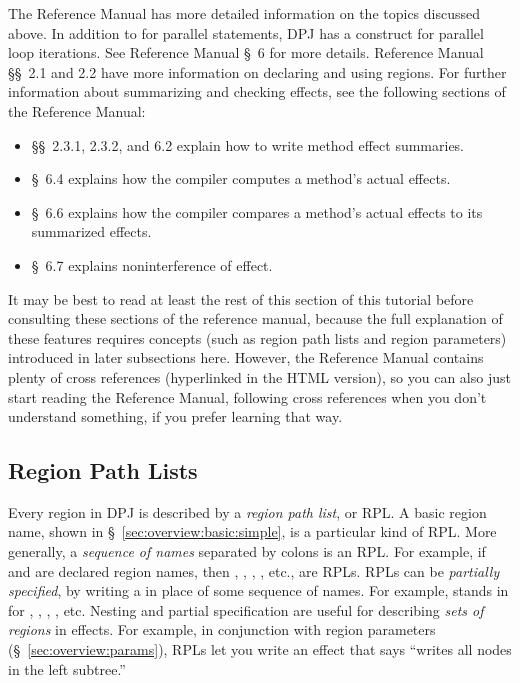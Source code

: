 The Reference Manual has more detailed information on the topics
discussed above.  In addition to  for parallel
statements, DPJ has a  construct for parallel loop
iterations.  See Reference Manual \S~6 for more details.  Reference
Manual \S\S~2.1 and 2.2 have more information on declaring and using
regions.  For further information about summarizing and checking
effects, see the following sections of the Reference Manual:
%
\begin{itemize}
%
\item 
\S\S~2.3.1, 2.3.2, and 6.2 explain how to write method effect summaries.
%
\item
\S~6.4 explains how the compiler computes a method's actual effects.
%
\item
\S~6.6 explains how the compiler compares a method's actual effects to
its summarized effects.
%
\item
\S~6.7 explains noninterference of effect.
\end{itemize}
%
It may be best to read at least the rest of this section of this
tutorial before consulting these sections of the reference manual,
because the full explanation of these features requires concepts (such
as region path lists and region parameters) introduced in later
subsections here.  However, the Reference Manual contains plenty of
cross references (hyperlinked in the HTML version), so you can also
just start reading the Reference Manual, following cross references
when you don't understand something, if you prefer learning that way.

\subsection{Region Path Lists%
\label{sec:overview:rpls}}

Every region in DPJ is described by a \emph{region path list}, or RPL.
A basic region name, shown in \S~\ref{sec:overview:basic:simple}, is a
particular kind of RPL.  More generally, a \emph{sequence of names}
separated by colons is an RPL.  For example, if  and 
are declared region names, then , , ,
, etc., are RPLs.  RPLs can be \emph{partially specified},
by writing a \kwd{*} in place of some sequence of names.  For example,
 stands in for , , ,
, etc.  Nesting and partial specification are useful for
describing \emph{sets of regions} in effects.  For example, in
conjunction with region parameters (\S~\ref{sec:overview:params}),
RPLs let you write an effect that says ``writes all nodes in the left
subtree.''

